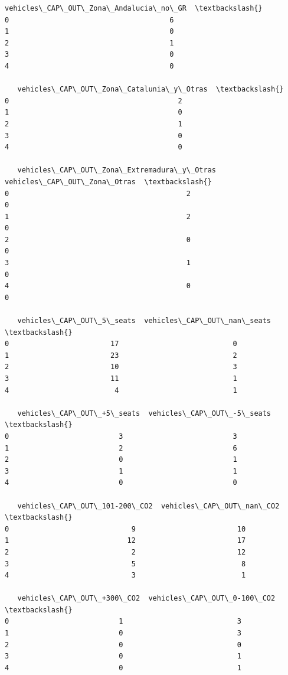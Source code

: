 \documentclass[11pt]{article}
\begin{document}
\begin{tcolorbox}[breakable, size=fbox, boxrule=.5pt, pad at break*=1mm, opacityfill=0]
\begin{Verbatim}[commandchars=\\\{\}]
   vehicles\_CAP\_OUT\_Zona\_Andalucia\_no\_GR  \textbackslash{}
0                                      6
1                                      0
2                                      1
3                                      0
4                                      0

   vehicles\_CAP\_OUT\_Zona\_Catalunia\_y\_Otras  \textbackslash{}
0                                        2
1                                        0
2                                        1
3                                        0
4                                        0

   vehicles\_CAP\_OUT\_Zona\_Extremadura\_y\_Otras  vehicles\_CAP\_OUT\_Zona\_Otras  \textbackslash{}
0                                          2                            0
1                                          2                            0
2                                          0                            0
3                                          1                            0
4                                          0                            0

   vehicles\_CAP\_OUT\_5\_seats  vehicles\_CAP\_OUT\_nan\_seats  \textbackslash{}
0                        17                           0
1                        23                           2
2                        10                           3
3                        11                           1
4                         4                           1

   vehicles\_CAP\_OUT\_+5\_seats  vehicles\_CAP\_OUT\_-5\_seats  \textbackslash{}
0                          3                          3
1                          2                          6
2                          0                          1
3                          1                          1
4                          0                          0

   vehicles\_CAP\_OUT\_101-200\_CO2  vehicles\_CAP\_OUT\_nan\_CO2  \textbackslash{}
0                             9                        10
1                            12                        17
2                             2                        12
3                             5                         8
4                             3                         1

   vehicles\_CAP\_OUT\_+300\_CO2  vehicles\_CAP\_OUT\_0-100\_CO2  \textbackslash{}
0                          1                           3
1                          0                           3
2                          0                           0
3                          0                           1
4                          0                           1


\end{Verbatim}
\end{tcolorbox}
\end{document}
